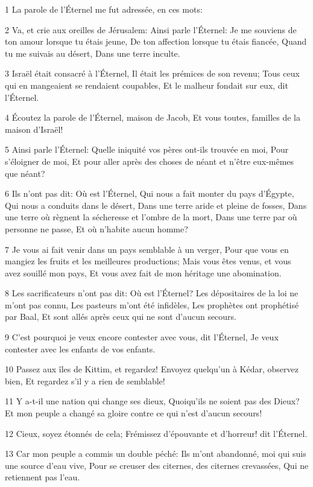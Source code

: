 \par 1 La parole de l'Éternel me fut adressée, en ces mots:
\par 2 Va, et crie aux oreilles de Jérusalem: Ainsi parle l'Éternel: Je me souviens de ton amour lorsque tu étais jeune, De ton affection lorsque tu étais fiancée, Quand tu me suivais au désert, Dans une terre inculte.
\par 3 Israël était consacré à l'Éternel, Il était les prémices de son revenu; Tous ceux qui en mangeaient se rendaient coupables, Et le malheur fondait sur eux, dit l'Éternel.
\par 4 Écoutez la parole de l'Éternel, maison de Jacob, Et vous toutes, familles de la maison d'Israël!
\par 5 Ainsi parle l'Éternel: Quelle iniquité vos pères ont-ils trouvée en moi, Pour s'éloigner de moi, Et pour aller après des choses de néant et n'être eux-mêmes que néant?
\par 6 Ils n'ont pas dit: Où est l'Éternel, Qui nous a fait monter du pays d'Égypte, Qui nous a conduits dans le désert, Dans une terre aride et pleine de fosses, Dans une terre où règnent la sécheresse et l'ombre de la mort, Dans une terre par où personne ne passe, Et où n'habite aucun homme?
\par 7 Je vous ai fait venir dans un pays semblable à un verger, Pour que vous en mangiez les fruits et les meilleures productions; Mais vous êtes venus, et vous avez souillé mon pays, Et vous avez fait de mon héritage une abomination.
\par 8 Les sacrificateurs n'ont pas dit: Où est l'Éternel? Les dépositaires de la loi ne m'ont pas connu, Les pasteurs m'ont été infidèles, Les prophètes ont prophétisé par Baal, Et sont allés après ceux qui ne sont d'aucun secours.
\par 9 C'est pourquoi je veux encore contester avec vous, dit l'Éternel, Je veux contester avec les enfants de vos enfants.
\par 10 Passez aux îles de Kittim, et regardez! Envoyez quelqu'un à Kédar, observez bien, Et regardez s'il y a rien de semblable!
\par 11 Y a-t-il une nation qui change ses dieux, Quoiqu'ils ne soient pas des Dieux? Et mon peuple a changé sa gloire contre ce qui n'est d'aucun secours!
\par 12 Cieux, soyez étonnés de cela; Frémissez d'épouvante et d'horreur! dit l'Éternel.
\par 13 Car mon peuple a commis un double péché: Ils m'ont abandonné, moi qui suis une source d'eau vive, Pour se creuser des citernes, des citernes crevassées, Qui ne retiennent pas l'eau.
